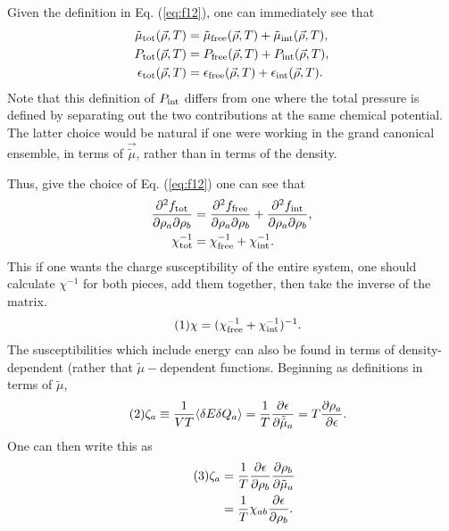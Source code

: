 \documentclass[12pt]{article}
\numberwithin{equation}{section}
\numberwithin{figure}{section}
\newcommand\eqnumber{\addtocounter{equation}{1}\tag{\theequation}}
\begin{document}
Given the definition in Eq. (\ref{eq:f12}), one can immediately see that
\begin{align*}
\tilde{\mu}_{\rm tot}(\vec{\rho},T)&=\tilde{\mu}_{\rm free}(\vec{\rho},T)+\tilde{\mu}_{\rm int}(\vec{\rho},T),\\
P_{\rm tot}(\vec{\rho},T)&=P_{\rm free}(\vec{\rho},T)+P_{\rm int}(\vec{\rho},T),\\
\epsilon_{\rm tot}(\vec{\rho},T)&=\epsilon_{\rm free}(\vec{\rho},T)+\epsilon_{\rm int}(\vec{\rho},T).
\end{align*}
Note that this definition of $P_{\rm int}$ differs from one where the total pressure is defined by separating out the two contributions at the same chemical potential. The latter choice would be natural if one were working in the grand canonical ensemble, in terms of $\vec{\tilde{\mu}}$, rather than in terms of the density.

Thus, give the choice of Eq. (\ref{eq:f12}) one can see that
\begin{align*}
\frac{\partial^2f_{\rm tot}}{\partial\rho_a\partial\rho_b}&=
\frac{\partial^2f_{\rm free}}{\partial\rho_a\partial\rho_b}+\frac{\partial^2f_{\rm int}}{\partial\rho_a\partial\rho_b},\\
\chi^{-1}_{\rm tot}&=\chi^{-1}_{\rm free}+\chi^{-1}_{\rm int}.
\end{align*}
This if one wants the charge susceptibility of the entire system, one should calculate $\chi^{-1}$ for both pieces, add them together, then take the inverse of the matrix.
\begin{align*}\eqnumber
\chi&=(\chi^{-1}_{\rm free}+\chi^{-1}_{\rm int})^{-1}.
\end{align*}
The susceptibilities which include energy can also be found in terms of density-dependent (rather that $\tilde{\mu}-$dependent functions. Beginning as definitions in terms of $\tilde{\mu}$,
\begin{align*}\eqnumber
\zeta_a&\equiv\frac{1}{VT}\langle\delta E\delta Q_a\rangle=\frac{1}{T}\frac{\partial\epsilon}{\partial\tilde{\tilde{\mu}}_a}
=T\frac{\partial\rho_a}{\partial\epsilon}.
\end{align*}
One can then write this as
\begin{align*}\eqnumber
\zeta_a&=\frac{1}{T}\frac{\partial\epsilon}{\partial\rho_b}\frac{\partial\rho_b}{\partial\tilde{\mu}_a}\\
&=\frac{1}{T}\chi_{ab}\frac{\partial\epsilon}{\partial\rho_b}.
\end{align*}
\end{document}
